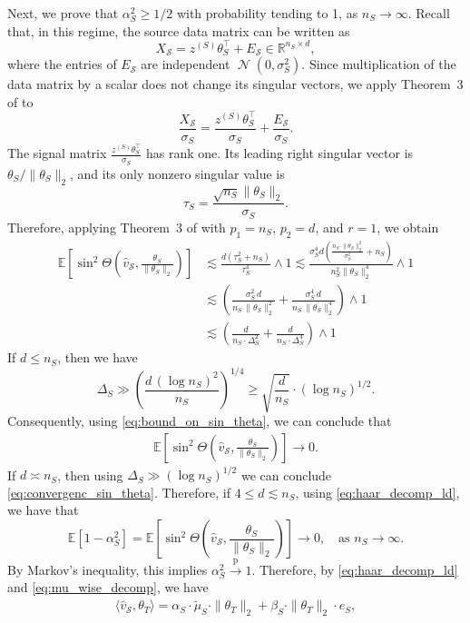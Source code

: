 \documentclass[10pt]{article}
\newcommand{\convp}{\xrightarrow{\mathrm{p}}}
\newcommand{\wh}{\widehat}
\newcommand{\wt}{\widetilde}
\DeclareMathOperator{\dnorm}{\mathcal N}
\newcommand{\trg}{T}
\newcommand{\thetaT}{\theta_{\trg}}
\newcommand{\calS}{\mathcal S}
\newcommand{\src}{S}
\newcommand{\thetaS}{\theta_{\src}}
\newcommand{\nS}{n_{\src}}
\newcommand{\sigmaS}{\sigma_{\src}}
\newcommand{\zsrc}{z^{(\src)}}
\newcommand{\DeltaS}{\Delta_{\src}}
\begin{document}
Next, we prove that $\alpha^2_\src \ge 1/2$ with probability tending to 1, as $\nS \to \infty$. Recall that, in this regime, the source data matrix can be written as
\[
X_{\calS}=\zsrc\thetaS^\top+E_{\calS}\in \mathbb R^{\nS\times d},
\]
where the entries of $E_{\calS}$ are independent
$\dnorm(0,\sigma_\src^2)$. Since multiplication of the data matrix by a scalar does not change its singular vectors, we apply Theorem~3 of \citet{CaiZhang2018} to
\[
\frac{X_{\calS}}{\sigmaS}=\frac{\zsrc\thetaS^\top}{\sigmaS}
+\frac{E_{\calS}}{\sigmaS}.
\]
The signal matrix $\frac{\zsrc\thetaS^\top}{\sigmaS}$
has rank one. Its leading right singular vector is $\thetaS/\|\thetaS\|_2$, and its only nonzero singular value is
\[
\tau_\src=\frac{\sqrt{\nS}\|\thetaS\|_2}{\sigmaS}.
\]
Therefore, applying Theorem~3 of \citet{CaiZhang2018} with
$p_1=\nS$, $p_2=d$, and $r=1$, we obtain
\begin{align}
\label{eq:bound_on_sin_theta}
\mathbb E\left[\sin^2\Theta\left(\wh v_{\calS},\frac{\thetaS}{\|\thetaS\|_2}\right)\right] &\lesssim  \frac{d\left(\tau_\src^2+\nS\right)}{\tau_\src^4}\wedge 1  \lesssim \frac{\sigmaS^4 d\left(\frac{\nS \cdot \|\thetaS\|^2_2}{\sigmaS^2}+\nS\right)}{\nS^2 \|\thetaS\|^4_2}\wedge 1\\
& \lesssim \left(\frac{\sigmaS^2\,d}{\nS\,\|\thetaS\|^2_2}+\frac{\sigmaS^4\,d}{\nS\,\|\thetaS\|^4_2}\right) \wedge 1\\
& \lesssim \left(\frac{d}{\nS \cdot \DeltaS^2}+\frac{d}{\nS \cdot \DeltaS^4}\right) \wedge 1
\end{align}
If $d \le \nS$, then we have
\[
\DeltaS \gg \left(\frac{d\,(\log \nS)^2}{\nS}\right)^{1/4} \ge \sqrt{\frac{d}{\nS}} \cdot(\log \nS)^{1/2}.
\]
Consequently, using \eqref{eq:bound_on_sin_theta}, we can conclude that
\begin{align}
\label{eq:convergenc_sin_theta}
\mathbb E\left[\sin^2\Theta\left(\wh v_{\calS},\frac{\thetaS}{\|\thetaS\|_2}\right)\right] \to 0.
\end{align}
If $d \asymp \nS$, then using $\DeltaS \gg (\log \nS)^{1/2}$ we can conclude \eqref{eq:convergenc_sin_theta}.
Therefore, if $4 \le d \lesssim \nS$, using \eqref{eq:haar_decomp_ld}, we have that 
\[
\mathbb E\left[1-\alpha^2_\src\right]=\mathbb E\left[\sin^2\Theta\left(\wh v_{\calS},\frac{\thetaS}{\|\thetaS\|_2}\right)\right] \to 0, \quad \mbox{as $\nS \to \infty$.}
\]
By Markov's inequality, this implies $\alpha^2_\src \convp 1$. Therefore, by \eqref{eq:haar_decomp_ld} and \eqref{eq:mu_wise_decomp}, we have
\begin{align}
\label{eq:inner_prod_haar}
    \langle \wh v_\calS,\thetaT\rangle = \alpha_\src \cdot \wt\mu_\src \cdot \|\thetaT\|_2+\beta_\src \cdot \|\thetaT\|_2 \cdot e_\src,
\end{align}
\end{document}
